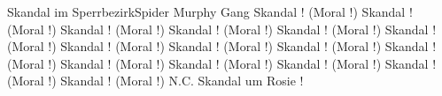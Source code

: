 \begin{song}{Skandal im Sperrbezirk}{Spider Murphy Gang}{}
Skandal ! (Moral !) Skandal ! (Moral !)
Skandal ! (Moral !) Skandal ! (Moral !)
Skandal ! (Moral !) Skandal ! (Moral !)
Skandal ! (Moral !) Skandal ! (Moral !)
Skandal ! (Moral !) Skandal ! (Moral !)
Skandal ! (Moral !) Skandal ! (Moral !)
Skandal ! (Moral !) Skandal ! (Moral !)
Skandal ! (Moral !) N.C.
Skandal um Rosie !
\end{song}
